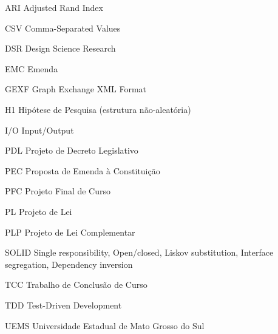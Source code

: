 \documentclass[
      12pt,
      a4paper,
      openright,
      oneside,
      chapter=TITLE,
      section=TITLE,
      english,
      french,
      spanish,
      brazilian
    ]{abntex2}
\begin{document}
        \listoftables*
        \newpage
    
        \begin{siglas}
            \item [ARI]   Adjusted Rand Index
            \item [CSV]   Comma-Separated Values
            \item [DSR]   Design Science Research
            \item [EMC]   Emenda
            \item [GEXF]  Graph Exchange XML Format
            \item [H1]    Hipótese de Pesquisa (estrutura não-aleatória)
            \item [I/O]   Input/Output
            \item [PDL]   Projeto de Decreto Legislativo
            \item [PEC]   Proposta de Emenda à Constituição
            \item [PFC]   Projeto Final de Curso
            \item [PL]    Projeto de Lei
            \item [PLP]   Projeto de Lei Complementar
            \item [SOLID] Single responsibility, Open/closed, Liskov substitution, Interface segregation, Dependency inversion
            \item [TCC]   Trabalho de Conclusão de Curso
            \item [TDD]   Test-Driven Development
            \item [UEMS]  Universidade Estadual de Mato Grosso do Sul
        \end{siglas}
    
\end{document}
